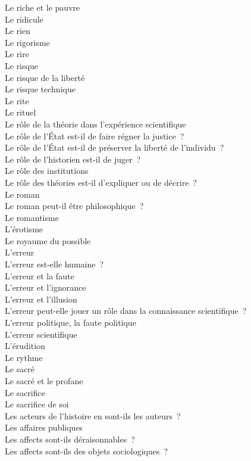 \documentclass[a4paper,12pt]{article}
\begin{document}
Le riche et le pauvre \\
Le ridicule \\
Le rien \\
Le rigorisme \\
Le rire \\
Le risque \\
Le risque de la liberté \\
Le risque technique \\
Le rite \\
Le rituel \\
Le rôle de la théorie dans l'expérience scientifique \\
Le rôle de l'État est-il de faire régner la justice ? \\
Le rôle de l'État est-il de préserver la liberté de l'individu ? \\
Le rôle de l'historien est-il de juger ? \\
Le rôle des institutions \\
Le rôle des théories est-il d'expliquer ou de décrire ? \\
Le roman \\
Le roman peut-il être philosophique ? \\
Le romantisme \\
L'érotisme \\
Le royaume du possible \\
L'erreur \\
L'erreur est-elle humaine ? \\
L'erreur et la faute \\
L'erreur et l'ignorance \\
L'erreur et l'illusion \\
L'erreur peut-elle jouer un rôle dans la connaissance scientifique ? \\
L'erreur politique, la faute politique \\
L'erreur scientifique \\
L'érudition \\
Le rythme \\
Le sacré \\
Le sacré et le profane \\
Le sacrifice \\
Le sacrifice de soi \\
Les acteurs de l'histoire en sont-ils les auteurs ? \\
Les affaires publiques \\
Les affects sont-ils déraisonnables ? \\
Les affects sont-ils des objets sociologiques ? \\
\end{document}

